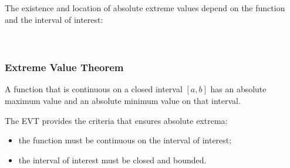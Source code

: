 \documentclass[14pt]{beamer}
\begin{document}
\begin{frame}
\footnotesize
The existence and location of absolute extreme values depend on the function and the interval of interest:
\begin{columns}[T]
\begin{column}{.5\textwidth}
\begin{block}{}
\end{block}
\end{column}
\begin{column}{.5\textwidth}
\begin{block}{}
\end{block}
\end{column}
\end{columns}
\end{frame}

\begin{frame}
\frametitle{}
\begin{columns}%
\begin{column}{.5\textwidth}
\begin{block}{}
\end{block}
\end{column}
\begin{column}{.5\textwidth}
\begin{block}{}
\end{block}
\end{column}
\end{columns}
\end{frame}

\begin{frame}
\frametitle{Extreme Value Theorem}
\small
\begin{thm} A function that is continuous on a closed interval $[a,b]$ has an absolute maximum value and an absolute minimum value on that interval. \end{thm}

\vspace{1pc}
The EVT provides the criteria that ensures absolute extrema:
\begin{itemize}
\item the function must be continuous on the interval of interest;
\item the interval of interest must be closed and bounded.
\end{itemize}
\end{frame}
\end{document}
